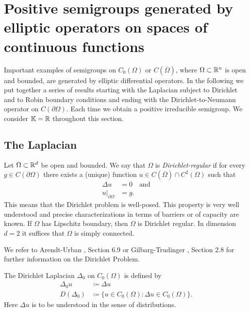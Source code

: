 
\section[Positive semigroups generated by elliptic operators]{Positive semigroups generated by elliptic operators on spaces of continuous functions}
Important examples of semigroups on $C_0(\Omega)$ or $C(\overline{\Omega})$, where $\Omega \subset \mathbb{R}^n$ is open and bounded, are generated by elliptic differential operators. In the following we put together a series of results starting with the Laplacian subject to Dirichlet and to Robin boundary conditions and ending with the Dirichlet-to-Neumann operator on $C(\partial\Omega)$. Each time we obtain a positive irreducible semigroup. We consider $\mathbb{K} = \mathbb{R}$ throughout this section.
\subsection{The Laplacian}
Let $\Omega \subset \mathbb{R}^d$ be open and bounded. We say that $\Omega$ is \emph{Dirichlet-regular} if for every $g \in C(\partial\Omega)$ there exists a (unique) function $u \in C(\overline{\Omega}) \cap C^2(\Omega)$ such that
\begin{align*}
 	\Delta u &= 0 \quad \text{and} \\
	u|_{\partial\Omega} &= g.
\end{align*} 
This means that the Dirichlet problem is well-posed. 
This property is very well understood and precise characterizations in terms of barriers or of capacity are known. 
If $\Omega$ has Lipschitz boundary, then $\Omega$ is Dirichlet regular. 
In dimension $d = 2$ it suffices that $\Omega$ is simply connected.

We refer to Arendt-Urban \cite{Au23}, Section 6.9 or Gilbarg-Trudinger \cite{GT83}, Section 2.8 for further information on the Dirichlet Problem. 

The Dirichlet Laplacian $\Delta_0$ on $C_0(\Omega)$ is defined by
\begin{align*}
 	\Delta_0 u &\coloneq \Delta u \\
 	D(\Delta_0) &\coloneq \{ u \in C_0(\Omega) \colon \Delta u \in C_0(\Omega) \}.
\end{align*}
Here $\Delta u$ is to be understood in the sense of distributions.

